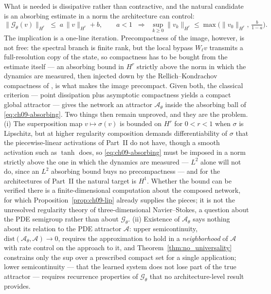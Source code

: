 What is needed is dissipative rather than contractive, and the natural candidate
is an absorbing estimate in a norm the architecture can control:
\begin{equation}
  \big\|\mathcal{G}_\theta(v)\big\|_{H^r} \;\le\; a\,\|v\|_{H^r}+b,
  \qquad a<1
  \;\;\Longrightarrow\;\;
  \sup_{k\ge 0}\|v_k\|_{H^r}\le \max\Big(\|v_0\|_{H^r},\,\tfrac{b}{1-a}\Big).
  \label{eq:ch09-absorbing}
\end{equation}
The implication is a one-line iteration. Precompactness of the image, however, is
not free: the spectral branch is finite rank, but the local bypass $W_\ell v$
transmits a full-resolution copy of the state, so compactness has to be bought
from the estimate itself --- an absorbing bound in $H^{r}$ strictly above the
norm in which the dynamics are measured, then injected down by the
Rellich--Kondrachov compactness of
, is what makes the
image precompact. Given both, the classical criterion --- point dissipation plus
asymptotic compactness yields a compact global attractor --- gives the network
an attractor $\mathcal{A}_\theta$ inside the absorbing ball of
\eqref{eq:ch09-absorbing}. Two things
then remain unproved, and they are the problem. (i) The superposition map
$v\mapsto\sigma(v)$ is bounded on $H^r$ for
$0<r<1$ when $\sigma$ is Lipschitz, but at higher regularity composition demands
differentiability of $\sigma$ that the piecewise-linear activations of Part~II do
not have, though a smooth activation such as $\tanh$ does, so
\eqref{eq:ch09-absorbing} must be imposed in a norm strictly above the one in
which the dynamics are measured --- $L^2$ alone will not do, since an $L^2$
absorbing bound buys no precompactness --- and for the architectures of Part~II
the natural target is $H^1$. Whether the bound can be verified there is a
finite-dimensional computation about the composed network, for which
Proposition~\ref{prop:ch09-lip} already supplies the pieces; it is not the
unresolved regularity theory of three-dimensional Navier--Stokes, a question
about the PDE semigroup rather than about $\mathcal{G}_\theta$. (ii) Existence of
$\mathcal{A}_\theta$ says nothing about its relation to the PDE attractor
$\mathcal{A}$: upper semicontinuity, $\mathrm{dist}(\mathcal{A}_\theta,\mathcal{A})\to 0$,
requires the approximation to hold in a \emph{neighborhood} of $\mathcal{A}$ with
rate control on the approach to it, and Theorem~\ref{thm:no_universality}
constrains only the sup over a prescribed compact set for a single application;
lower semicontinuity --- that the learned
system does not lose part of the true attractor --- requires recurrence
properties of $\mathcal{G}_\theta$ that no architecture-level result provides.

